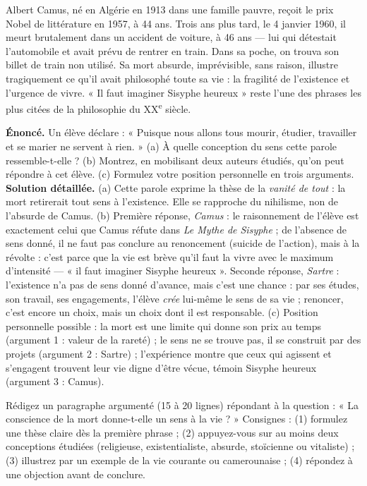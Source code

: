 \documentclass[11pt]{article}
\begin{document}
\begin{savaistu}
Albert Camus, né en Algérie en 1913 dans une famille pauvre, reçoit le prix Nobel de littérature en 1957, à 44 ans. Trois ans plus tard, le 4 janvier 1960, il meurt brutalement dans un accident de voiture, à 46 ans — lui qui détestait l'automobile et avait prévu de rentrer en train. Dans sa poche, on trouva son billet de train non utilisé. Sa mort absurde, imprévisible, sans raison, illustre tragiquement ce qu'il avait philosophé toute sa vie : la fragilité de l'existence et l'urgence de vivre. « Il faut imaginer Sisyphe heureux » reste l'une des phrases les plus citées de la philosophie du XX\textsuperscript{e} siècle.
\end{savaistu}

\begin{exoresolu}
\textbf{Énoncé.} Un élève déclare : « Puisque nous allons tous mourir, étudier, travailler et se marier ne servent à rien. » (a) À quelle conception du sens cette parole ressemble-t-elle ? (b) Montrez, en mobilisant deux auteurs étudiés, qu'on peut répondre à cet élève. (c) Formulez votre position personnelle en trois arguments.
\tcblower
\textbf{Solution détaillée.} (a) Cette parole exprime la thèse de la \emph{vanité de tout} : la mort retirerait tout sens à l'existence. Elle se rapproche du nihilisme, non de l'absurde de Camus. (b) Première réponse, \emph{Camus} : le raisonnement de l'élève est exactement celui que Camus réfute dans \emph{Le Mythe de Sisyphe} ; de l'absence de sens donné, il ne faut pas conclure au renoncement (suicide de l'action), mais à la révolte : c'est parce que la vie est brève qu'il faut la vivre avec le maximum d'intensité — « il faut imaginer Sisyphe heureux ». Seconde réponse, \emph{Sartre} : l'existence n'a pas de sens donné d'avance, mais c'est une chance : par ses études, son travail, ses engagements, l'élève \emph{crée} lui-même le sens de sa vie ; renoncer, c'est encore un choix, mais un choix dont il est responsable. (c) Position personnelle possible : la mort est une limite qui donne son prix au temps (argument 1 : valeur de la rareté) ; le sens ne se trouve pas, il se construit par des projets (argument 2 : Sartre) ; l'expérience montre que ceux qui agissent et s'engagent trouvent leur vie digne d'être vécue, témoin Sisyphe heureux (argument 3 : Camus).
\end{exoresolu}

\begin{exercice}
Rédigez un paragraphe argumenté (15 à 20 lignes) répondant à la question : « La conscience de la mort donne-t-elle un sens à la vie ? » Consignes : (1) formulez une thèse claire dès la première phrase ; (2) appuyez-vous sur au moins deux conceptions étudiées (religieuse, existentialiste, absurde, stoïcienne ou vitaliste) ; (3) illustrez par un exemple de la vie courante ou camerounaise ; (4) répondez à une objection avant de conclure.
\end{exercice}
\end{document}
